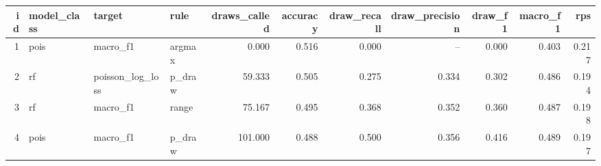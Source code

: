 
\begin{tabular}{rlllrrrrrrr}
\toprule
id & model\_class & target & rule & draws\_called & accuracy & draw\_recall & draw\_precision & draw\_f1 & macro\_f1 & rps\\
\midrule
1 & pois & macro\_f1 & argmax & 0.000 & 0.516 & 0.000 & -- & 0.000 & 0.403 & 0.217\\
2 & rf & poisson\_log\_loss & p\_draw & 59.333 & 0.505 & 0.275 & 0.334 & 0.302 & 0.486 & 0.194\\
3 & rf & macro\_f1 & range & 75.167 & 0.495 & 0.368 & 0.352 & 0.360 & 0.487 & 0.198\\
4 & pois & macro\_f1 & p\_draw & 101.000 & 0.488 & 0.500 & 0.356 & 0.416 & 0.489 & 0.197\\
\bottomrule
\end{tabular}
